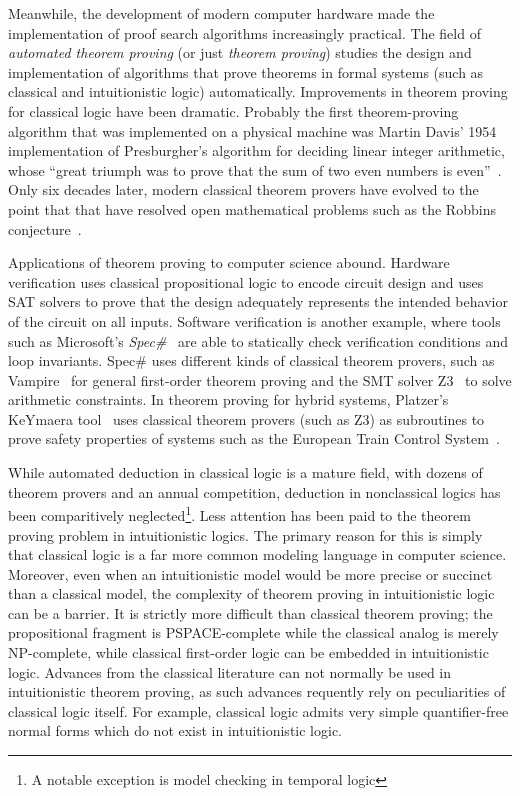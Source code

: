 
Meanwhile, the development of modern computer hardware made the implementation
of proof search algorithms increasingly practical.  The field of
\emph{automated theorem proving} (or just \emph{theorem proving})
studies the design and implementation of algorithms that prove theorems in
formal systems (such as classical and intuitionistic logic) automatically.
Improvements in theorem proving for classical logic have been dramatic.
Probably the first theorem-proving algorithm that was implemented on a physical machine was
Martin Davis' 1954 implementation of Presburgher's algorithm for deciding linear
integer arithmetic, whose ``great triumph was to prove that the sum of two even numbers
is even''~\cite{Davis.2001.History}.  Only six decades later,
modern classical theorem provers
have evolved to the point that that have resolved open mathematical
problems such as the Robbins conjecture~\cite{McCune.JAR.1997}.

Applications of theorem proving to computer science abound.
Hardware verification uses classical propositional logic
to encode circuit design and uses SAT solvers to prove that the design
adequately represents the intended behavior of the circuit on all inputs.
Software verification is another example,
where tools such as Microsoft's \emph{Spec\#}~\cite{Barnett.2005.CASSIS} are able to
statically check verification conditions and loop invariants.  Spec\# uses
different kinds of classical theorem provers, such as
Vampire~\cite{Voronkov.1999.CADE} for general first-order theorem proving
and the SMT solver Z3~\cite{Moura.2008.TACAS} to solve arithmetic constraints.
In theorem proving for
hybrid systems, Platzer's KeYmaera
tool~\cite{Platzer.2008.IJCAR} uses classical theorem provers (such as Z3)
as subroutines to prove safety properties of systems such as the
European Train Control System~\cite{Platzer.2009.ICFEM}.

While automated deduction in
classical logic is a mature field, with dozens of theorem provers and an
annual competition, deduction in nonclassical logics has been
comparitively neglected\footnote{A notable exception is model checking in temporal
logic}.
Less attention has been paid to the theorem proving problem in intuitionistic
logics.  The primary reason for this is simply that classical logic is a far
more
common modeling language in computer science.  Moreover, even when an
intuitionistic model would be more precise or succinct than a classical model,
the complexity of theorem proving in intuitionistic logic can be a barrier.  It
is strictly more difficult than classical theorem proving; the propositional
fragment is PSPACE-complete while the classical analog is merely NP-complete,
while classical first-order logic can be embedded in intuitionistic logic.
Advances from the classical literature can not normally be used in
intuitionistic theorem
proving, as such advances requently rely on peculiarities of classical logic
itself.  For example, classical logic admits very simple quantifier-free normal
forms which do not exist in intuitionistic logic.

